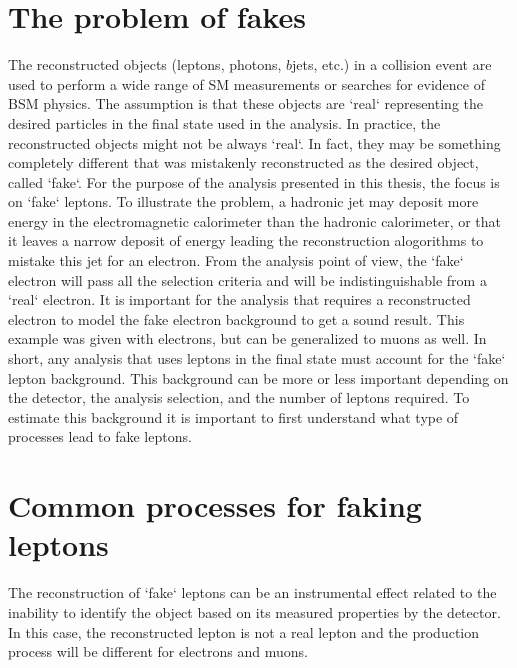 \section{The problem of fakes}

The reconstructed objects (leptons, photons, $b$jets, etc.) in a collision event are used to perform a wide range of SM measurements 
or searches for evidence of BSM physics. The assumption is that these objects are `real` representing the desired particles 
in the final state used in the analysis. 
In practice, the reconstructed objects might not be always `real`. In fact, they may be something completely different that
was mistakenly reconstructed as the desired object, called `fake`. 
For the purpose of the analysis presented in this thesis, the focus is on `fake` leptons. 
To illustrate the problem, a hadronic jet may deposit more energy in the electromagnetic calorimeter than the hadronic calorimeter, 
or that it leaves a narrow deposit of energy leading the reconstruction alogorithms to mistake this jet for an electron.
From the analysis point of view, the `fake` electron will pass all the selection criteria and will be indistinguishable from 
a `real` electron. 
It is important for the analysis that requires a reconstructed electron to model the fake electron background to get a sound 
result. This example was given with electrons, but can be generalized to muons as well. 
In short, any analysis that uses leptons in the final state must account for the `fake` lepton background. 
This background can be more or less important depending on the detector, the analysis selection, and the number of leptons required. 
To estimate this background it is important to first understand what type of processes lead to fake leptons.


\section{Common processes for faking leptons}

The reconstruction of `fake` leptons can be an instrumental effect related to the inability to identify the object based on 
its measured properties by the detector. In this case, the reconstructed lepton is not a real lepton and the production process 
will be different for electrons and muons.


